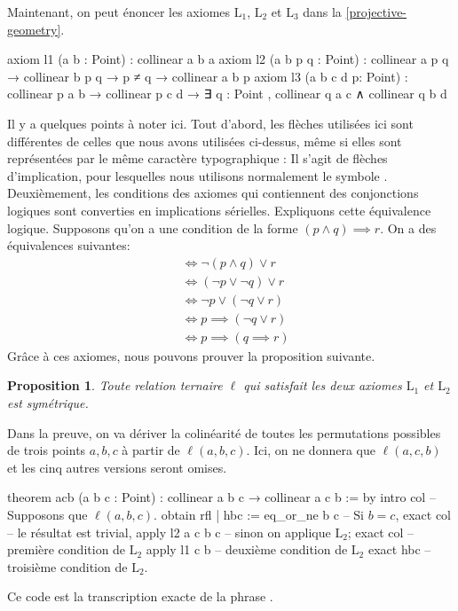 \documentclass[12pt, oneside]{memoir}
\newtheorem{prop}{Proposition}
\theoremstyle{definition}
\theoremstyle{remark}
\begin{document}
Maintenant, on peut énoncer les axiomes $\text{L}_1$, $\text{L}_2$ et
$\text{L}_3$ dans la \cref{projective-geometry}.
\begin{leancode}
  axiom l1 (a b : Point) : collinear a b a
  axiom l2 (a b p q : Point) : collinear a p q → collinear b p q →
  p ≠ q → collinear a b p
  axiom l3 (a b c d p: Point) : collinear p a b → collinear p c d →
  ∃ q : Point , collinear q a c ∧ collinear q b d
\end{leancode}
Il y a quelques points à noter ici. Tout d'abord, les flèches
utilisées ici sont différentes de celles que nous avons utilisées
ci-dessus, même si elles sont représentées par le même caractère
typographique : Il s'agit de flèches d'implication, pour lesquelles
nous utilisons normalement le symbole
\say{$\Longrightarrow$}. Deuxièmement, les conditions des axiomes qui
contiennent des conjonctions logiques sont converties en implications
sérielles. Expliquons cette équivalence logique. Supposons qu'on a une
condition de la forme $(p \land q) \implies r$. On a des équivalences
suivantes:
\begin{align*}
  &\iff \neg(p \land q) \lor r \\
  &\iff (\neg p \lor \neg q) \lor r \\
  &\iff \neg p \lor (\neg q \lor r) \\
  &\iff p \implies (\neg q \lor r) \\
  &\iff p \implies (q \implies r)
\end{align*}
Grâce à ces axiomes, nous pouvons prouver la proposition suivante.
\begin{prop}
  Toute relation ternaire $\ell$ qui satisfait les deux axiomes
  $\text{L}_1$ et $\text{L}_2$ est symétrique.
\end{prop}
Dans la preuve, on va dériver la colinéarité de toutes les
permutations possibles de trois points $a, b, c$ à partir de
$\ell(a, b, c)$. Ici, on ne donnera que $\ell(a, c, b)$ et les cinq
autres versions seront omises.
\begin{leancode}
  theorem acb (a b c : Point) : collinear a b c → collinear a c b := by
  intro col -- Supposons que $\ell(a,b,c)$.
  obtain rfl | hbc := eq_or_ne b c -- Si $b = c$,
  exact col -- le résultat est trivial,
  apply l2 a c b c -- sinon on applique $\text{L}_2$;
  exact col -- première condition de $\text{L}_2$
  apply l1 c b -- deuxième condition de $\text{L}_2$
  exact hbc -- troisième condition de $\text{L}_2$.
\end{leancode}
Ce code est la transcription exacte de la phrase .
\end{document}
